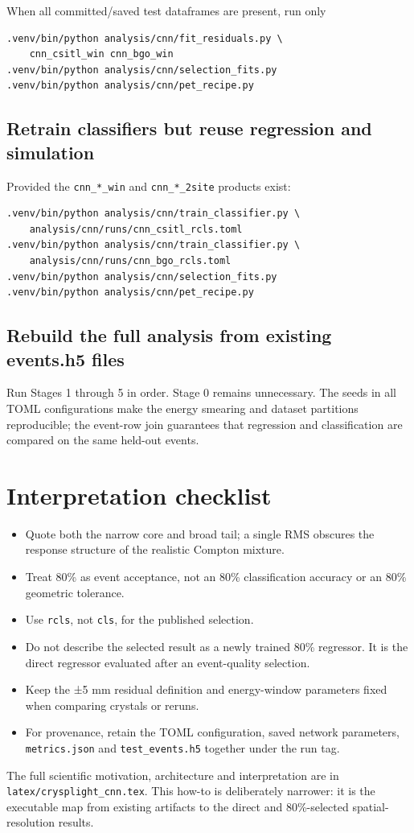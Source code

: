 \documentclass[11pt,a4paper]{article}
\newcommand{\code}[1]{\nolinkurl{#1}}
\begin{document}
When all committed/saved test dataframes are present, run only

\begin{verbatim}
.venv/bin/python analysis/cnn/fit_residuals.py \
    cnn_csitl_win cnn_bgo_win
.venv/bin/python analysis/cnn/selection_fits.py
.venv/bin/python analysis/cnn/pet_recipe.py
\end{verbatim}

\subsection*{Retrain classifiers but reuse regression and simulation}

Provided the \code{cnn\_*\_win} and \code{cnn\_*\_2site} products exist:

\begin{verbatim}
.venv/bin/python analysis/cnn/train_classifier.py \
    analysis/cnn/runs/cnn_csitl_rcls.toml
.venv/bin/python analysis/cnn/train_classifier.py \
    analysis/cnn/runs/cnn_bgo_rcls.toml
.venv/bin/python analysis/cnn/selection_fits.py
.venv/bin/python analysis/cnn/pet_recipe.py
\end{verbatim}

\subsection*{Rebuild the full analysis from existing events.h5 files}

Run Stages 1 through 5 in order. Stage 0 remains unnecessary. The seeds in all
TOML configurations make the energy smearing and dataset partitions
reproducible; the event-row join guarantees that regression and classification
are compared on the same held-out events.

\section{Interpretation checklist}

\begin{itemize}
  \item Quote both the narrow core and broad tail; a single RMS obscures the
  response structure of the realistic Compton mixture.
  \item Treat 80\% as event acceptance, not an 80\% classification accuracy or
  an 80\% geometric tolerance.
  \item Use \code{rcls}, not \code{cls}, for the published selection.
  \item Do not describe the selected result as a newly trained 80\% regressor.
  It is the direct regressor evaluated after an event-quality selection.
  \item Keep the ±5 mm residual definition and energy-window parameters fixed
  when comparing crystals or reruns.
  \item For provenance, retain the TOML configuration, saved network parameters,
  \code{metrics.json} and \code{test\_events.h5} together under the run tag.
\end{itemize}

The full scientific motivation, architecture and interpretation are in
\code{latex/crysplight\_cnn.tex}. This how-to is deliberately narrower: it is
the executable map from existing artifacts to the direct and 80\%-selected
spatial-resolution results.
\end{document}
